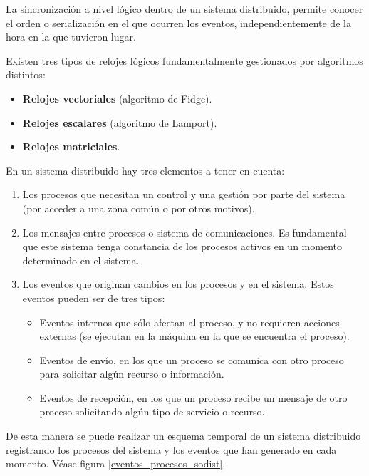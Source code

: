 \documentclass[a4paper, 11pt, titlepage]{article}
\begin{document}
        La sincronización a nivel lógico dentro de un sistema distribuido, permite conocer el orden o 
        serialización en el que ocurren los eventos, independientemente de la hora en la que tuvieron 
        lugar.

        Existen tres tipos de relojes lógicos fundamentalmente gestionados por algoritmos distintos:

        \begin{itemize}
            \item \textbf{Relojes vectoriales} (algoritmo de Fidge).
            \item \textbf{Relojes escalares} (algoritmo de Lamport).
            \item \textbf{Relojes matriciales}.
        \end{itemize}

        En un sistema distribuido hay tres elementos a tener en cuenta:

        \begin{enumerate}
            \item Los procesos que necesitan un control y una gestión por parte del sistema (por acceder 
            a una zona común o por otros motivos).
            \item Los mensajes entre procesos o sistema de comunicaciones. Es fundamental que este sistema 
            tenga constancia de los procesos activos en un momento determinado en el sistema.
            \item Los eventos que originan cambios en los procesos y en el sistema. Estos eventos pueden 
            ser de tres tipos: 
            \begin{itemize}
                \item Eventos internos que sólo afectan al proceso, y no requieren acciones externas (se 
                ejecutan en la máquina en la que se encuentra el proceso).
                \item Eventos de envío, en los que un proceso se comunica con otro proceso para solicitar 
                algún recurso o información.
                \item Eventos de recepción, en los que un proceso recibe un mensaje de otro proceso solicitando 
                algún tipo de servicio o recurso.
            \end{itemize}
        \end{enumerate} 

        De esta manera se puede realizar un esquema temporal de un sistema distribuido registrando los 
        procesos del sistema y los eventos que han generado en cada momento. Véase figura \ref{eventos_procesos_sodist}.
\end{document}
